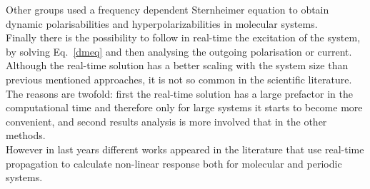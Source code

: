 Other groups used a frequency dependent Sternheimer equation to obtain dynamic polarisabilities and hyperpolarizabilities in molecular systems.\cite{andrade2007time} \\
Finally there is the possibility to follow in real-time the excitation of the system, by solving Eq.~\ref{dmeq} and then analysing the outgoing polarisation or current. Although the real-time solution has a better scaling  with the system size  than  previous mentioned approaches, it is not so common in the scientific literature. The reasons are twofold: first the real-time solution has a large prefactor in the computational time  and therefore only for large systems it starts to become more convenient, and second results analysis is more involved that in the other methods. \\ 
However in last years different works appeared in the literature that use real-time propagation to calculate non-linear response both for molecular\cite{takimoto:154114,ding2013efficient} and periodic systems.\cite{goncharov2013nonlinear}\\

